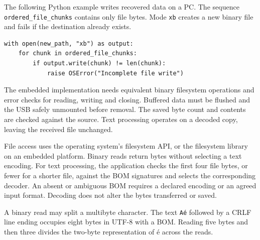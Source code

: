 \documentclass[10pt,a4paper]{article}
\newcommand{\code}[1]{\texttt{#1}}
\newcommand{\topic}[1]{\vspace{5pt}{\large\bfseries #1}\par}
\begin{document}
The following Python example writes recovered data on a PC. The sequence \code{ordered\_file\_chunks} contains only file bytes. Mode \code{xb} creates a new binary file and fails if the destination already exists.
{\small
\begin{verbatim}
with open(new_path, "xb") as output:
    for chunk in ordered_file_chunks:
        if output.write(chunk) != len(chunk):
            raise OSError("Incomplete file write")
\end{verbatim}
}
The embedded implementation needs equivalent binary filesystem operations and error checks for reading, writing and closing. Buffered data must be flushed and the USB safely unmounted before removal. The saved byte count and contents are checked against the source. Text processing operates on a decoded copy, leaving the received file unchanged.

\topic{5. File reading and chunk boundaries}
File access uses the operating system's filesystem API, or the filesystem library on an embedded platform. Binary reads return bytes without selecting a text encoding. For text processing, the application checks the first four file bytes, or fewer for a shorter file, against the BOM signatures and selects the corresponding decoder. An absent or ambiguous BOM requires a declared encoding or an agreed input format. Decoding does not alter the bytes transferred or saved.

A binary read may split a multibyte character. The text \code{A\'{e}} followed by a CRLF line ending occupies eight bytes in UTF-8 with a BOM. Reading five bytes and then three divides the two-byte representation of \'{e} across the reads.

\begin{center}
\end{center}
\end{document}
